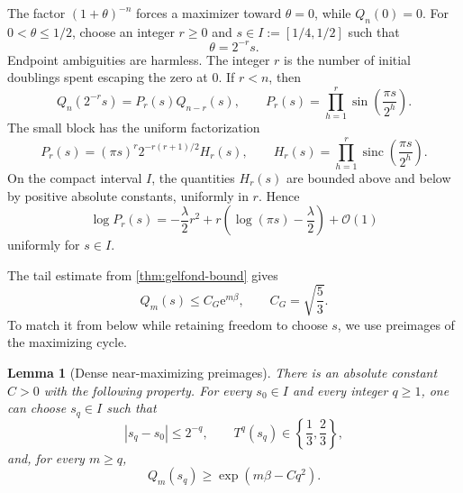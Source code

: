 \documentclass[11pt,oneside]{article}
\newtheorem{lemma}[lemma]{Lemma}
\theoremstyle{definition}
\theoremstyle{remark}
\newcommand{\sinc}{\operatorname{sinc}}
\newcommand{\e}{\mathrm e}
\newcommand{\bigO}{\mathcal O}
\begin{document}
The factor \((1+\theta)^{-n}\) forces a maximizer toward \(\theta=0\), while
\(Q_n(0)=0\).  For \(0<\theta\le1/2\), choose an integer \(r\ge0\) and
\(s\in I:=[1/4,1/2]\) such that
\begin{equation}
 \theta=2^{-r}s.
 \label{eq:transition-coordinates}
\end{equation}
Endpoint ambiguities are harmless.  The integer \(r\) is the number of
initial doublings spent escaping the zero at \(0\).  If \(r<n\), then
\begin{equation}
 Q_n(2^{-r}s)=P_r(s)Q_{n-r}(s),
 \qquad
 P_r(s)=\prod_{h=1}^{r}\sin\!\left(\frac{\pi s}{2^h}\right).
 \label{eq:Q-transition-factorization}
\end{equation}
The small block has the uniform factorization
\begin{equation}
 P_r(s)
 =(\pi s)^r2^{-r(r+1)/2}H_r(s),
 \qquad
 H_r(s)=\prod_{h=1}^{r}
 \sinc\!\left(\frac{\pi s}{2^h}\right).
 \label{eq:small-block-factorization}
\end{equation}
On the compact interval \(I\), the quantities \(H_r(s)\) are bounded above
and below by positive absolute constants, uniformly in \(r\).  Hence
\begin{equation}
 \log P_r(s)
 =-\frac{\lambda}{2}r^2
 +r\left(\log(\pi s)-\frac\lambda2\right)
 +\bigO(1)
 \label{eq:small-block-log}
\end{equation}
uniformly for \(s\in I\).

The tail estimate from \cref{thm:gelfond-bound} gives
\begin{equation}
 Q_m(s)\le C_G\e^{m\beta},
 \qquad C_G=\sqrt{\frac53}.
 \label{eq:tail-upper}
\end{equation}
To match it from below while retaining freedom to choose \(s\), we use
preimages of the maximizing cycle.

\begin{lemma}[Dense near-maximizing preimages]
\label{lem:dense-preimages}
There is an absolute constant \(C>0\) with the following property.  For every
\(s_0\in I\) and every integer \(q\ge1\), one can choose
\(s_q\in I\) such that
\begin{equation}
 |s_q-s_0|\le2^{-q},
 \qquad
 T^q(s_q)\in\left\{\frac13,\frac23\right\},
 \label{eq:preimage-approximation}
\end{equation}
and, for every \(m\ge q\),
\begin{equation}
 Q_m(s_q)\ge\exp(m\beta-Cq^2).
 \label{eq:preimage-tail-lower}
\end{equation}
\end{lemma}
\end{document}
